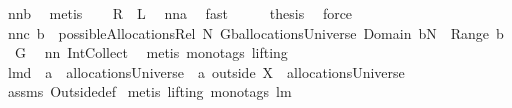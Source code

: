 \begin{isabellebody}
\ nn{}{}b\ \isamarkupfalse%
\ metis\ \isamarkupfalse%
\ \isamarkupfalse%
\ {\isachardoublequoteopen}{\isacharquery}R\ {\isasymsubseteq}\ {\isacharquery}L{\isachardoublequoteclose}\ \isamarkupfalse%
\ nn{}{}a\ \isamarkupfalse%
\ fast\isanewline
\ \ \isamarkupfalse%
\ \isamarkupfalse%
\ {\isacharquery}thesis\ \isamarkupfalse%
\ force\isanewline
{}\isamarkupfalse%
%
\endisatagproof
{\isafoldproof}%
%
\isadelimproof
\isanewline
%
\endisadelimproof
\isanewline
{}\isamarkupfalse%
\ nn{}{}c{\isacharcolon}\ {\isachardoublequoteopen}b\ {\isasymin}\ possibleAllocationsRel\ N\ G{\isacharequal}{\isacharparenleft}b{\isasymin}allocationsUniverse{\isacharampersand}\ Domain\ b{\isasymsubseteq}N\ {\isacharampersand}\ {\isasymUnion}Range\ b\ {\isacharequal}\ G{\isacharparenright}{\isachardoublequoteclose}\ \isanewline
%
\isadelimproof
%
\endisadelimproof
%
\isatagproof
{}\isamarkupfalse%
\ nn{}{}\ Int{\isacharunderscore}Collect\ \isamarkupfalse%
\ {\isacharparenleft}metis\ {\isacharparenleft}mono{\isacharunderscore}tags{\isacharcomma}\ lifting{\isacharparenright}{\isacharparenright}%
\endisatagproof
{\isafoldproof}%
%
\isadelimproof
\isanewline
%
\endisadelimproof
\isanewline
{}\isamarkupfalse%
\ lm{}{}d{\isacharcolon}\ \ {\isachardoublequoteopen}a\ {\isasymin}\ allocationsUniverse{\isachardoublequoteclose}\ \ {\isachardoublequoteopen}a\ outside\ X\ {\isasymin}\ allocationsUniverse{\isachardoublequoteclose}%
\isadelimproof
\ %
\endisadelimproof
%
\isatagproof
{}\isamarkupfalse%
\ assms\ Outside{\isacharunderscore}def\isanewline
{}\isamarkupfalse%
\ {\isacharparenleft}metis\ {\isacharparenleft}lifting{\isacharcomma}\ mono{\isacharunderscore}tags{\isacharparenright}\ lm{}{}{\isacharparenright}%
\endisatagproof
{\isafoldproof}%
%
\isadelimproof
%
\endisadelimproof
\isanewline
%
\isadelimtheory
\isanewline
%
\endisadelimtheory
%
\isatagtheory
{}\isamarkupfalse%
%
\endisatagtheory
{\isafoldtheory}%
%
\isadelimtheory
%
\endisadelimtheory
\end{isabellebody}%
